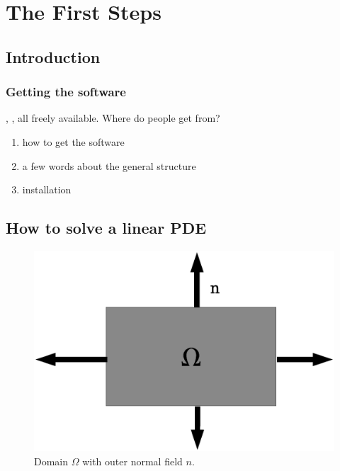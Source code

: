 
\chapter{The First Steps}

\section{Introduction}

\subsection{Getting the software}

\escript, \ESyS, all freely available.  Where do people get \finley from?

\begin{enumerate}
\item how to get the software
\item a few words about the general structure
\item installation
\end{enumerate}

\section{How to solve a linear PDE}

\begin{figure}
\centerline{\includegraphics[width=\figwidth]{FirstStepDomain}}
\caption{Domain $\Omega$ with outer normal field $n$.}
\label{fig:FirstSteps.1}
\end{figure}

